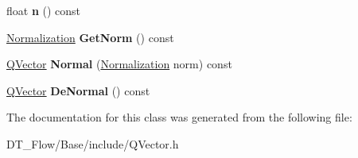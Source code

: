 \begin{DoxyCompactItemize}
float {\bfseries n} () const
\item 
\mbox{\label{classQn_1_1QVectorPtr_ac91bcde375b134312f5d90c1ee46d9c3}} 
\mbox{\hyperlink{classQn_1_1CorrectionQnVector_a2998fe4babb716c57848c8c73b24a398}{Normalization}} {\bfseries Get\+Norm} () const
\item 
\mbox{\label{classQn_1_1QVectorPtr_a8dc1632aa9032511ff4dd82a9b7d8f70}} 
\mbox{\hyperlink{classQn_1_1QVector}{Q\+Vector}} {\bfseries Normal} (\mbox{\hyperlink{classQn_1_1CorrectionQnVector_a2998fe4babb716c57848c8c73b24a398}{Normalization}} norm) const
\item 
\mbox{\label{classQn_1_1QVectorPtr_a3a91f1494f2acef333e54f87231569a9}} 
\mbox{\hyperlink{classQn_1_1QVector}{Q\+Vector}} {\bfseries De\+Normal} () const
\end{DoxyCompactItemize}


The documentation for this class was generated from the following file\+:\begin{DoxyCompactItemize}
\item 
D\+T\+\_\+\+Flow/\+Base/include/Q\+Vector.\+h\end{DoxyCompactItemize}
